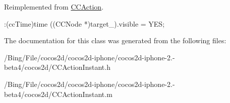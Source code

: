 Reimplemented from \hyperlink{interface_c_c_action_a41207f5e0f31713136c8b690fcf166ef}{C\-C\-Action}.


\begin{DoxyCode}
              :(ccTime)time
{
        ((CCNode *)target_).visible = YES;
}
\end{DoxyCode}


The documentation for this class was generated from the following files\-:\begin{DoxyCompactItemize}
\item 
/\-Bing/\-File/cocos2d/cocos2d-\/iphone/cocos2d-\/iphone-\/2.-\/beta4/cocos2d/C\-C\-Action\-Instant.\-h\item 
/\-Bing/\-File/cocos2d/cocos2d-\/iphone/cocos2d-\/iphone-\/2.-\/beta4/cocos2d/C\-C\-Action\-Instant.\-m\end{DoxyCompactItemize}
